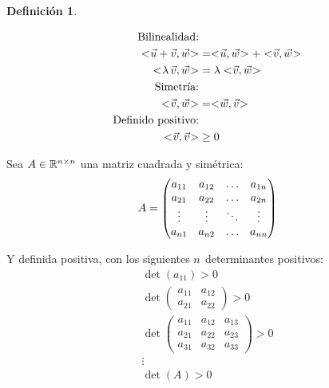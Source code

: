 \documentclass[a5paper,12pt,twoside]{book}
\newtheorem{defn}{{Definición}}[chapter]
\begin{document}
\begin{mdframed}[style=MyFrame1]
    \begin{defn}
        \label{defn:intProd}
    \end{defn}
    \begin{align*}
        \textrm{Bilinealidad:} &
        \\
        \intProd{\Vec{u}+\Vec{v}}{\Vec{w}} &= \intProd{\Vec{u}}{\Vec{w}} + \intProd{\Vec{v}}{\Vec{w}}
        \\
        \intProd{\lambda \, \Vec{v}}{\Vec{w}} &= \lambda \intProd{\Vec{v}}{\Vec{w}}
        \\
        \textrm{Simetría:} &
        \\
        \intProd{\Vec{v}}{\Vec{w}} &= \intProd{\Vec{w}}{\Vec{v}}
        \\
        \textrm{Definido positivo:} &
        \\
        \intProd{\Vec{v}}{\Vec{v}} &\geq 0
    \end{align*}
\end{mdframed}

Sea $A\in\mathbb{R}^{n\times n}$ una matriz cuadrada y simétrica:
\begin{equation*}
    A =
    \begin{pmatrix}
        a_{11} & a_{12} & \dots & a_{1n}
        \\
        a_{21} & a_{22} & \dots & a_{2n}
        \\
        \vdots & \vdots & \ddots & \vdots
        \\
        a_{n 1} & a_{n 2} & \dots & a_{n n}
    \end{pmatrix}
\end{equation*}

Y definida positiva, con los siguientes $n$ determinantes positivos:
\begin{gather*}
    \operatorname{det}(a_{11})>0
    \\
    \operatorname{det}
    \begin{pmatrix}
        a_{11} & a_{12}
        \\
        a_{21} & a_{22}
    \end{pmatrix}
    >0
    \\
    \operatorname{det}
    \begin{pmatrix}
        a_{11} & a_{12} & a_{13}
        \\
        a_{21} & a_{22} & a_{23}
        \\
        a_{31} & a_{32} & a_{33}
    \end{pmatrix}
    >0
    \\
    \vdots
    \\
    \operatorname{det}(A)>0
\end{gather*}
\end{document}
